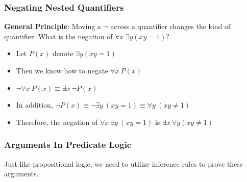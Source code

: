 \documentclass[12pt, letterpaper]{article}
\begin{document}
\pagebreak

\subsubsection{Negating Nested Quantifiers}
\bigbreak
\textbf{General Principle}: Moving a $\neg$ across a quantifier changes the kind of quantifier.
\bigbreak
What is the negation of $\forall x \ \exists y (xy = 1)?$
\begin{itemize}[label={}]
	\item Let $P(x)$ denote $\exists y (xy = 1)$
	\item Then we know how to negate $\forall x \ P(x)$
	\item $\neg \forall x \ P(x) \equiv \exists x \ \neg P(x)$
	\item In addition, $\neg P(x) \equiv \neg \exists y \ (xy = 1) \equiv \forall y \ (xy \ne 1)$
	\item Therefore, the negation of $\forall x \ \exists y \ (xy =1)$ is $\exists x \ \forall y (xy \ne 1)$
\end{itemize}

\pagebreak


\subsubsection{Arguments In Predicate Logic}
Just like propositional logic, we need to utilize inference rules to prove these arguments.
\end{document}
